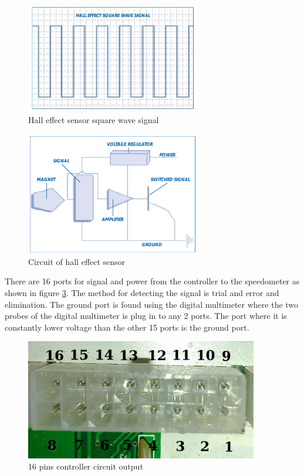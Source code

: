 \begin{figure} [htb]
	\centering
	\includegraphics[width=3in]{images/hall_effect_signals.jpg}
	\caption{Hall effect sensor square wave signal \citep{counterpoint31}}
	\label{im:hall_signal}
\end{figure}

\begin{figure} [htb]
	\centering
	\includegraphics[width=3in]{images/hall_sensor_circuit.png}
	\caption{Circuit of hall effect sensor \citep{counterpoint31}}
	\label{im:hall_circuit}
\end{figure}

There are 16 ports for signal and power from the controller to the speedometer as shown in figure \ref{im:16pin}. The method for detecting the signal is trial and error and elimination. The ground port is found using the digital multimeter where the two probes of the digital multimeter is plug in to any 2 ports. The port where it is constantly lower voltage than the other 15 ports is the ground port.

\begin{figure} [htb]
	\centering
	\includegraphics[width=4in]{images/16pin.jpg}
	\caption{16 pins controller circuit output}
	\label{im:16pin}
\end{figure}

